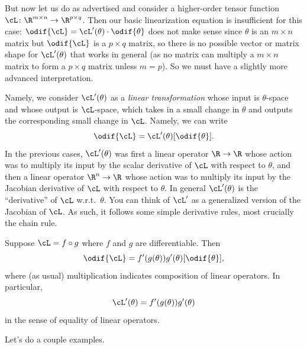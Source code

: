 \documentclass[../../book-main.tex]{subfiles}
\begin{document}
But now let us do as advertised and consider a higher-order tensor function \(\cL \colon \R^{m \times n} \to \R^{p \times q}\). Then our basic linearization equation is insufficient for this case: \(\odif{\cL} = \cL^{\prime}(\theta) \cdot \odif{\theta}\) does not make sense since \(\theta\) is an \(m \times n\) matrix but \(\odif{\cL}\) is a \(p \times q\) matrix, so there is no possible vector or matrix shape for \(\cL^{\prime}(\theta)\) that works in general (as no matrix can multiply a \(m \times n\) matrix to form a \(p \times q\) matrix unless \(m = p\)). So we must have a slightly more advanced interpretation. 

Namely, we consider \(\cL^{\prime}(\theta)\) as a \textit{linear transformation} whose input is \(\theta\)-space and whose output is \(\cL\)-space, which takes in a small change in \(\theta\) and outputs the corresponding small change in \(\cL\). Namely, we can write 
\begin{equation}
    \odif{\cL} = \cL^{\prime}(\theta)[\odif{\theta}].
\end{equation}
In the previous cases, \(\cL^{\prime}(\theta)\) was first a linear operator \(\R \to \R\) whose action was to multiply its input by the scalar derivative of \(\cL\) with respect to \(\theta\), and then a linear operator \(\R^{n} \to \R\) whose action was to multiply its input by the Jacobian derivative of \(\cL\) with respect to \(\theta\). In general \(\cL^{\prime}(\theta)\) is the ``derivative'' of \(\cL\) w.r.t.~\(\theta\). You can think of \(\cL^{\prime}\) as a generalized version of the Jacobian of \(\cL\). As such, it follows some simple derivative rules, most crucially the chain rule.

\begin{theorem}
    Suppose \(\cL = f \circ g\) where \(f\) and \(g\) are differentiable. Then 
    \begin{equation}
        \odif{\cL} = f^{\prime}(g(\theta))g^{\prime}(\theta)[\odif{\theta}],
    \end{equation}
    where (as usual) multiplication indicates composition of linear operators. In particular,
    \begin{equation}
        \cL^{\prime}(\theta) = f^{\prime}(g(\theta))g^{\prime}(\theta)
    \end{equation}
    in the sense of equality of linear operators. 
\end{theorem}

Let's do a couple examples.
\end{document}
